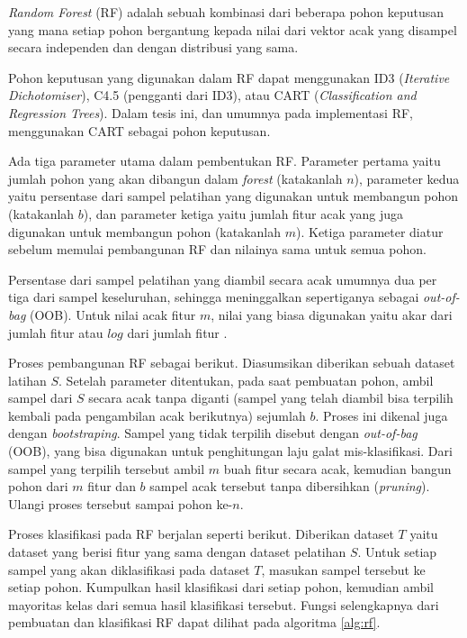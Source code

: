 \textit{Random Forest} (RF) \cite{breiman2001random}
adalah sebuah kombinasi dari beberapa pohon keputusan yang mana setiap pohon
bergantung kepada nilai dari vektor acak yang disampel secara independen dan
dengan distribusi yang sama.

Pohon keputusan yang digunakan dalam RF dapat menggunakan ID3
(\textit{Iterative Dichotomiser}), C4.5 (pengganti dari ID3), atau CART
(\textit{Classification and Regression Trees}).
Dalam tesis ini, dan umumnya pada implementasi RF, menggunakan CART sebagai
pohon keputusan.

Ada tiga parameter utama dalam pembentukan RF.
Parameter pertama yaitu jumlah pohon yang akan dibangun dalam \textit{forest}
(katakanlah $n$),
parameter kedua yaitu persentase dari sampel pelatihan yang digunakan untuk
membangun pohon (katakanlah $b$),
dan parameter ketiga yaitu jumlah fitur acak yang juga digunakan untuk
membangun pohon (katakanlah $m$).
Ketiga parameter diatur sebelum memulai pembangunan RF dan nilainya sama untuk
semua pohon.

Persentase dari sampel pelatihan yang diambil secara acak umumnya dua per tiga
dari sampel keseluruhan, sehingga meninggalkan sepertiganya sebagai
\textit{out-of-bag} (OOB).
Untuk nilai acak fitur $m$, nilai yang biasa digunakan yaitu akar dari jumlah
fitur atau $log$ dari jumlah fitur \cite{breiman2001random}.

Proses pembangunan RF sebagai berikut.
Diasumsikan diberikan sebuah dataset latihan $S$.
Setelah parameter ditentukan, pada saat pembuatan pohon, ambil sampel dari $S$
secara acak tanpa diganti (sampel yang telah diambil bisa terpilih kembali pada
pengambilan acak berikutnya) sejumlah $b$.
Proses ini dikenal juga dengan \textit{bootstraping}.
Sampel yang tidak terpilih disebut dengan \textit{out-of-bag} (OOB), yang
bisa digunakan untuk penghitungan laju galat mis-klasifikasi.
Dari sampel yang terpilih tersebut ambil $m$ buah fitur secara acak, kemudian
bangun pohon dari $m$ fitur dan $b$ sampel acak tersebut tanpa dibersihkan
(\textit{pruning}).
Ulangi proses tersebut sampai pohon ke-$n$.

Proses klasifikasi pada RF berjalan seperti berikut.
Diberikan dataset $T$ yaitu dataset yang berisi fitur yang sama dengan dataset
pelatihan $S$.
Untuk setiap sampel yang akan diklasifikasi pada dataset $T$, masukan sampel
tersebut ke setiap pohon.
Kumpulkan hasil klasifikasi dari setiap pohon, kemudian ambil mayoritas kelas
dari semua hasil klasifikasi tersebut.
Fungsi selengkapnya dari pembuatan dan klasifikasi RF dapat dilihat pada
algoritma \ref{alg:rf}.
